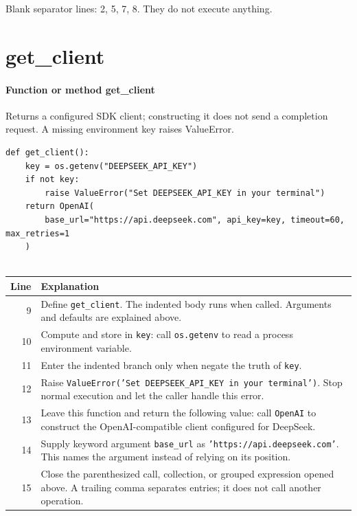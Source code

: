 \documentclass[11pt,a4paper]{book}
\begin{document}
Blank separator lines: 2, 5, 7, 8. They do not execute anything.

\section{get\_client}

\paragraph{Function or method get\_client}
Returns a configured SDK client; constructing it does not send a completion request. A missing environment key raises ValueError.


\begin{lstlisting}[firstnumber=9]
def get_client():
    key = os.getenv("DEEPSEEK_API_KEY")
    if not key:
        raise ValueError("Set DEEPSEEK_API_KEY in your terminal")
    return OpenAI(
        base_url="https://api.deepseek.com", api_key=key, timeout=60, max_retries=1
    )


\end{lstlisting}

\begin{longtable}{r p{}}

\textbf{Line} & \textbf{Explanation} \\ \hline \endhead

9 & Define \texttt{get\_client}. The indented body runs when called. Arguments and defaults are explained above. \\

10 & Compute and store in \texttt{key}: call \texttt{os.getenv} to read a process environment variable.  \\

11 & Enter the indented branch only when negate the truth of \texttt{key}. \\

12 & Raise \texttt{ValueError('Set DEEPSEEK\_API\_KEY in your terminal')}. Stop normal execution and let the caller handle this error. \\

13 & Leave this function and return the following value: call \texttt{OpenAI} to construct the OpenAI-compatible client configured for DeepSeek. \\

14 & Supply keyword argument \texttt{base\_url} as \texttt{'https://api.deepseek.com'}. This names the argument instead of relying on its position. \\

15 & Close the parenthesized call, collection, or grouped expression opened above. A trailing comma separates entries; it does not call another operation. \\

\end{longtable}
\end{document}
